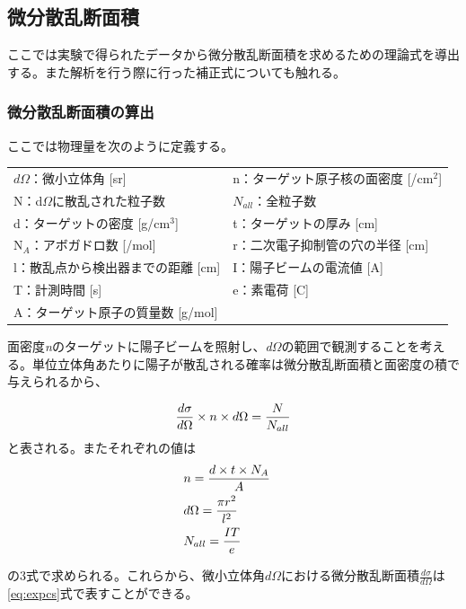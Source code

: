 \documentclass[a4paper,11pt,dvipdfmx]{jsarticle}
\begin{document}
\newpage

\subsection{微分散乱断面積}
ここでは実験で得られたデータから微分散乱断面積を求めるための理論式を導出する。また解析を行う際に行った補正式についても触れる。

\subsubsection{微分散乱断面積の算出}
ここでは物理量を次のように定義する。
\begin{table}[h]
\small
\it
\centering
\begin{tabular}{ll} 

  $d\Omega$：微小立体角 {\rm [sr]} & n：ターゲット原子核の面密度 {\rm [/cm$^2$]}\\
  N：d$\Omega$に散乱された粒子数 & $N_{all}$：全粒子数 \\ 
  d：ターゲットの密度 {\rm[g/cm$^3$]} & t：ターゲットの厚み {\rm[cm]} \\ 
  N$_A$：アボガドロ数 {\rm[/mol]} & r：二次電子抑制管の穴の半径 {\rm[cm]} \\ 
  l：散乱点から検出器までの距離 {\rm[cm]} & I：陽子ビームの電流値 {\rm[A]} \\ 
  T：計測時間 {\rm[s]} & e：素電荷 {\rm[C]}\\
  A：ターゲット原子の質量数 {\rm[g/mol]}
  \label{def1}
\end{tabular}
\end{table}

\noindent
    面密度{\it n}のターゲットに陽子ビームを照射し、{\it d$\Omega$}の範囲で観測することを考える。単位立体角あたりに陽子が散乱される確率は微分散乱断面積と面密度の積で与えられるから、

\begin{equation}
    \centering
    \frac{d\sigma}{d\Omega} \times n \times d\Omega = \frac{N}{N_{all}} 
\end{equation}
と表される。またそれぞれの値は
\begin{eqnarray}
    \centering
    &n = \frac{d \times t \times N_A}{A}&\\
    &d\Omega = \frac{\pi{r^2}}{l^2}&\\
    &N_{all} = \frac{IT}{e}&
\end{eqnarray}

の3式で求められる。これらから、微小立体角$d\Omega$における微分散乱断面積$\frac{d\sigma}{d\Omega}$は\eqref{eq:expcs}式で表すことができる。
\end{document}
